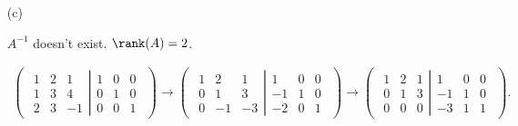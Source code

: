 \begin{Exercise}
\begin{enumerate}[(a)]
\item[(c)]
\begin{answer}
$A^{-1}$ doesn't exist. $\rank(A) = 2$.
\end{answer}
\begin{solution}
\begin{gather*}
\begin{pmatrix} \left.\begin{matrix}
1 & 2 & 1 \\
1 & 3 & 4 \\
2 & 3 & -1
\end{matrix} \right| \begin{matrix}
1 & 0 & 0 \\
0 & 1 & 0 \\
0 & 0 & 1
\end{matrix} \end{pmatrix} \longrightarrow \begin{pmatrix} \left.\begin{matrix}
1 & 2 & 1 \\
0 & 1 & 3 \\
0 & -1 & -3
\end{matrix} \right| \begin{matrix}
1 & 0 & 0 \\
-1 & 1 & 0 \\
-2 & 0 & 1
\end{matrix} \end{pmatrix} \longrightarrow \begin{pmatrix} \left.\begin{matrix}
1 & 2 & 1 \\
0 & 1 & 3 \\
0 & 0 & 0 
\end{matrix} \right| \begin{matrix}
1 & 0 & 0 \\
-1 & 1 & 0 \\
-3 & 1 & 1
\end{matrix} \end{pmatrix}.
\end{gather*}
\end{solution}
\end{enumerate}
\end{Exercise}